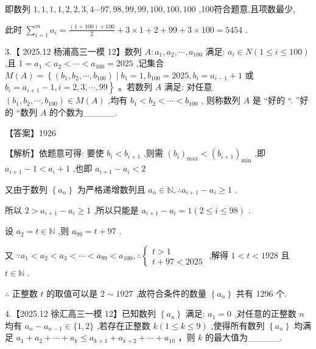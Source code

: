 \documentclass[10pt]{article}
\begin{document}
即数列 \(1,1,1,1,2,2,3,4\cdots {97},{98},{99},{99},{100},{100},{100}\) ,100符合题意,且项数最少,

此时 \(\mathop{\sum }\limits_{{i = 1}}^{m}{a}_{i} = \frac{\left( {1 + {100}}\right)  \times  {100}}{2} + 3 \times  1 + 2 + {99} + 3 \times  {100} = {5454}\) .

3.【 2025.12 杨浦高三一模 12】数列 \(A : {a}_{1},{a}_{2},\cdots ,{a}_{100}\) 满足: \({a}_{i} \in  N\left( {1 \leq  i \leq  {100}}\right)\) ,且 \(1 = {a}_{1} < {a}_{2} < \cdots  < {a}_{100} = {2025}\) ,记集合 \(M\left( A\right)  = \left\{  {\left( {{b}_{1},{b}_{2},\cdots ,{b}_{100}}\right)  \mid  {b}_{1} = 1,{b}_{100} = {2025},{b}_{i} = {a}_{i - 1} + 1}\right.\) 或 \(\left. {{b}_{i} = {a}_{i + 1} - 1,i = 2,3,\cdots ,{99}}\right\}\) 。若数列 \(A\) 满足: 对任意 \(\left( {{b}_{1},{b}_{2},\cdots ,{b}_{100}}\right)  \in  M\left( A\right)\) ,均有 \({b}_{1} < {b}_{2} < \cdots  < {b}_{100}\) , 则称数列 \(A\) 是 “好的 “. ”好的 “数列 \(A\) 的个数为\_\_\_\_\_.

【答案】1926

【解析】依题意可得: 要使 \({b}_{i} < {b}_{i + 1}\) ,则需 \({\left( {b}_{i}\right) }_{\max } < {\left( {b}_{i + 1}\right) }_{\min }\) ,即 \({a}_{i + 1} - 1 < {a}_{i} + 1\) ,也即 \({a}_{i + 1} - {a}_{i} < 2\)

又由于数列 \(\left\{  {a}_{n}\right\}\) 为严格递增数列且 \({a}_{n} \in  \mathbb{N},\therefore {a}_{i + 1} - {a}_{i} \geq  1\) .

所以 \(2 > {a}_{i + 1} - {a}_{i} \geq  1\) ,所以只能是 \({a}_{i + 1} - {a}_{i} = 1\left( {2 \leq  i \leq  {98}}\right)\) .

设 \({a}_{2} = t \in  \mathbb{N}\) ,则 \({a}_{99} = t + {97}\) .

又 \(\because {a}_{1} < {a}_{2} < {a}_{3} < \cdots  < {a}_{99} < {a}_{100},\therefore \left\{  \begin{array}{l} t > 1 \\  t + {97} < {2025} \end{array}\right.\) ,解得 \(1 < t < {1928}\) 且 \(t \in  \mathbb{N}\) .

\(\therefore\) 正整数 \(t\) 的取值可以是 \(2 \sim  {1927}\) ,故符合条件的数量 \(\left\{  {a}_{n}\right\}\) 共有 1296 个.

4.【2025.12 徐汇高三一模 12】已知数列 \(\left\{  {a}_{n}\right\}\) 满足: \({a}_{1} = 0\) ,对任意的正整数 \(n\) 均有 \({a}_{n} - {a}_{n - 1} \in  \{ 1,2\}\) ,若存在正整数 \(k\left( {1 \leq  k \leq  9}\right)\) ,使得所有数列 \(\left\{  {a}_{n}\right\}\) 均满足 \({a}_{1} + {a}_{2} + \cdots  + {a}_{k} \leq  {a}_{k + 1} + {a}_{k + 2} + \cdots  + {a}_{10}\) ，则 \(k\) 的最大值为\_\_\_\_\_.
\end{document}
